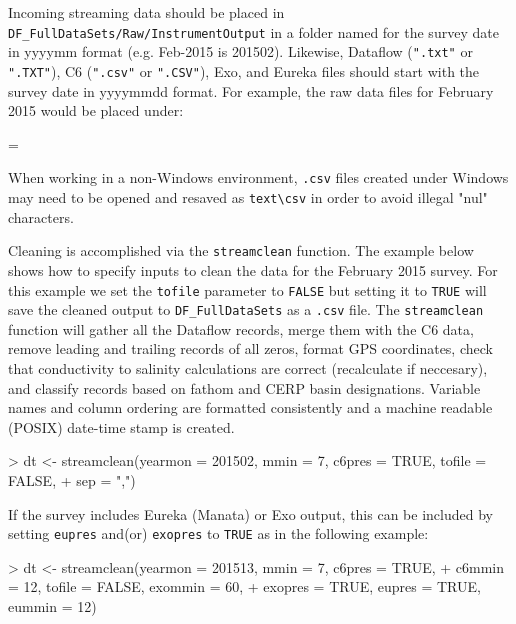 \documentclass[12pt]{article}
\newenvironment{warning}
{\par\begin{mdframed}[linewidth=2pt,linecolor=red]
\begin{list}{}{\leftmargin=1cm
  \labelwidth=\leftmargin}\item[\Large\ding{43}]}
{\end{list}\end{mdframed}\par}
\begin{document}
Incoming streaming data should be placed in \verb|DF_FullDataSets|\texttt{/Raw/InstrumentOutput} in a folder named for the survey date in yyyymm format (e.g. Feb-2015 is 201502). Likewise, Dataflow (\texttt{".txt"} or \texttt{".TXT"}), C6 (\texttt{".csv"} or \texttt{".CSV"}), Exo, and Eureka  files should start with the survey date in yyyymmdd format. For example, the raw data files for February 2015 would be placed under:


\begin{warning}
When working in a non-Windows environment, \texttt{.csv} files created under Windows may need to be opened and resaved as \texttt{text}\verb|\csv| in order to avoid illegal "nul" characters.
\end{warning}

\vspace{15pt}
Cleaning is accomplished via the \nohyphens{\texttt{streamclean}} function. The example below shows how to specify inputs to clean the data for the February 2015 survey. For this example we set the \texttt{tofile} parameter to \texttt{FALSE} but setting it to \texttt{TRUE} will save the cleaned output to \verb|DF_FullDataSets| as a \texttt{.csv} file. The \texttt{streamclean} function will gather all the Dataflow records, merge them with the C6 data, remove leading and trailing records of all zeros, format GPS coordinates, check that conductivity to salinity calculations are correct (recalculate if neccesary), and classify records based on fathom and CERP basin designations. Variable names and column ordering are formatted consistently and a machine readable (POSIX) date-time stamp is created.   

\begin{Schunk}
\begin{Sinput}
> dt <- streamclean(yearmon = 201502, mmin = 7, c6pres = TRUE, tofile = FALSE,
+                   sep = ",")
\end{Sinput}
\end{Schunk}

If the survey includes Eureka (Manata) or Exo output, this can be included by setting \texttt{eupres} and(or) \texttt{exopres} to \texttt{TRUE} as in the following example:

\begin{Schunk}
\begin{Sinput}
> dt <- streamclean(yearmon = 201513, mmin = 7, c6pres = TRUE,
+                   c6mmin = 12, tofile = FALSE, exommin = 60,
+                   exopres = TRUE, eupres = TRUE, eummin = 12)
\end{Sinput}
\end{Schunk}
\end{document}
